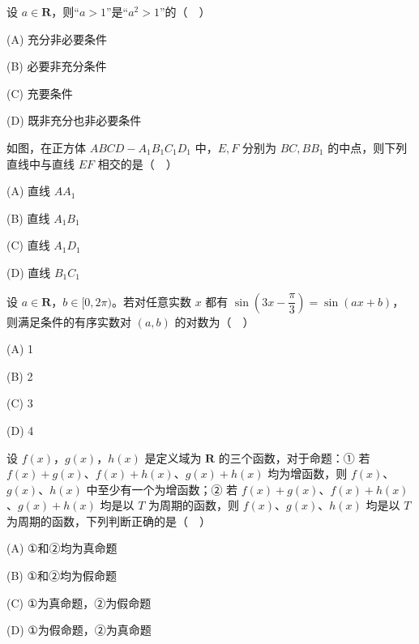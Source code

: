 \begin{question}
设 \(a\in\mathbf R\)，则“\(a>1\)”是“\(a^2>1\)”的（　）

\noindent(A) 充分非必要条件

\noindent(B) 必要非充分条件

\noindent(C) 充要条件

\noindent(D) 既非充分也非必要条件

\Needspace{0.4\textheight}
\end{question}
\begin{question}
如图，在正方体 \(ABCD-A_1B_1C_1D_1\) 中，\(E,F\) 分别为 \(BC,BB_1\) 的中点，则下列直线中与直线 \(EF\) 相交的是（　）
\nopagebreak[4]
\begin{center}\end{center}
\nopagebreak[4]
\noindent(A) 直线 \(AA_1\)

\noindent(B) 直线 \(A_1B_1\)

\noindent(C) 直线 \(A_1D_1\)

\noindent(D) 直线 \(B_1C_1\)

\end{question}
\begin{question}
设 \(a\in\mathbf R\)，\(b\in[0,2\pi)\)。若对任意实数 \(x\) 都有 \(\sin\left(3x-\dfrac\pi3\right)=\sin(ax+b)\)，则满足条件的有序实数对 \((a,b)\) 的对数为（　）

\noindent(A) 1

\noindent(B) 2

\noindent(C) 3

\noindent(D) 4

\end{question}
\begin{question}
设 \(f(x)\)，\(g(x)\)，\(h(x)\) 是定义域为 \(\mathbf R\) 的三个函数，对于命题：① 若 \(f(x)+g(x)\)、\(f(x)+h(x)\)、\(g(x)+h(x)\) 均为增函数，则 \(f(x)\)、\(g(x)\)、\(h(x)\) 中至少有一个为增函数；② 若 \(f(x)+g(x)\)、\(f(x)+h(x)\)、\(g(x)+h(x)\) 均是以 \(T\) 为周期的函数，则 \(f(x)\)、\(g(x)\)、\(h(x)\) 均是以 \(T\) 为周期的函数，下列判断正确的是（　）

\noindent(A) ①和②均为真命题

\noindent(B) ①和②均为假命题

\noindent(C) ①为真命题，②为假命题

\noindent(D) ①为假命题，②为真命题

\end{question}

